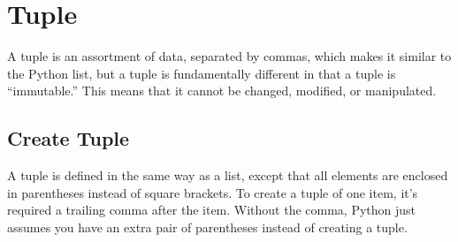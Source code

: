 \documentclass[letterpaper,12pt,english]{sphinxmanual}
\begin{document}
\section{Tuple}
\label{\detokenize{struct:tuple}}
\sphinxAtStartPar
A tuple is an assortment of data, separated by commas, which makes it similar to the Python list, but a tuple is fundamentally different in that a tuple is “immutable.” This means that it cannot be changed, modified, or manipulated.


\subsection{Create Tuple}
\label{\detokenize{struct:create-tuple}}
\sphinxAtStartPar
A tuple is defined in the same way as a list, except that all elements are enclosed in parentheses instead of square brackets.
To create a tuple of one item, it’s required a trailing comma after the item.
Without the comma, Python just assumes you have an extra pair of parentheses instead of creating a tuple.

\sphinxAtStartPar
{}
\begin{quote}

\begin{sphinxVerbatim}[commandchars=\\\{\}]
  

   

  

  \PYG{p}{[}\PYG{p}{]}
  
\end{sphinxVerbatim}
\end{quote}
\end{document}
